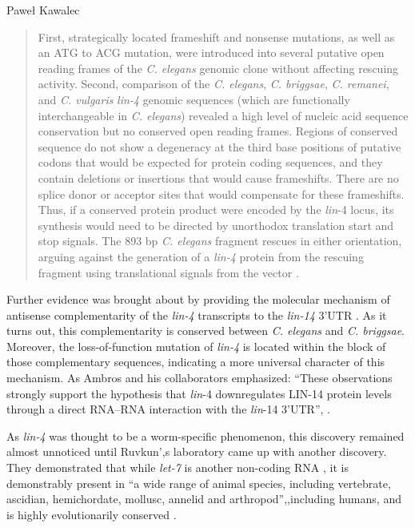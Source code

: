 \begin{artengenv}{Paweł Kawalec}
\begin{quotation}
First, strategically located frameshift and nonsense mutations, as well as an ATG to ACG mutation, were introduced into several putative open reading frames of the \textit{C. elegans} genomic clone without affecting rescuing activity. Second, comparison of the \textit{C. elegans}, \textit{C. briggsae}, \textit{C. remanei}, and \textit{C. vulgaris} \textit{lin-4} genomic sequences (which are functionally interchangeable in \textit{C. elegans}) revealed a high level of nucleic acid sequence conservation but no conserved open reading frames. Regions of conserved sequence do not show a degeneracy at the third base positions of putative codons that would be expected for protein coding sequences, and they contain deletions or insertions that would cause frameshifts. There are no splice donor or acceptor sites that would compensate for these frameshifts. Thus, if a conserved protein product were encoded by the \textit{lin}-4 locus, its synthesis would need to be directed by unorthodox translation start and stop signals. The 893 bp \textit{C. elegans} fragment rescues in either orientation, arguing against the generation of a \textit{lin-4} protein from the rescuing fragment using translational signals from the vector
\parencite[][p.849]{lee_c_1993}.%


\end{quotation}
Further evidence was brought about by providing the molecular mechanism of antisense complementarity of the \textit{lin-4} transcripts to the \textit{lin-14} 3'UTR
\parencite[][]{wightman_posttranscriptional_1993}. %
 As it turns out, this complementarity is conserved between \textit{C. elegans} and \textit{C. briggsae}. Moreover, the loss-of-function mutation of \textit{lin-4} is located within the block of those complementary sequences, indicating a more universal character of this mechanism. As Ambros and his collaborators emphasized: ``These observations strongly support the hypothesis that \textit{lin}-4 downregulates LIN-14 protein levels through a direct RNA–RNA interaction with the \textit{lin}-14 3'UTR'',
\parencite[][p.850]{lee_c_1993}.%


As \textit{lin-4} was thought to be a worm-specific phenomenon, this discovery remained almost unnoticed until Ruvkun',s laboratory came up with another discovery. They demonstrated that while \textit{let-7} is another non-coding RNA
\parencite[][]{reinhart_21-nucleotide_2000}, %
 it is demonstrably present in ``a wide range of animal species, including vertebrate, ascidian, hemichordate, mollusc, annelid and arthropod'',,including humans, and is highly evolutionarily conserved 
\parencite[][p.86]{pasquinelli_conservation_2000}.%



\end{artengenv}
